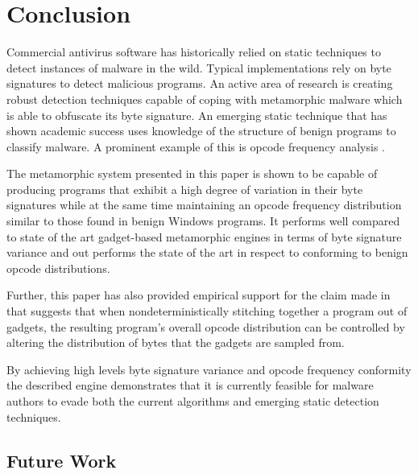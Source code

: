 \chapter{Conclusion}

    Commercial antivirus software has historically relied on static techniques
    to detect instances of malware in the wild. Typical implementations rely on
    byte signatures to detect malicious programs. An active area of research is
    creating robust detection techniques capable of coping with metamorphic
    malware which is able to obfuscate its byte signature. An emerging static
    technique that has shown academic success uses knowledge of the structure of
    benign programs to classify malware. A prominent example of this is opcode
    frequency analysis \cite{chisquared}.

    The metamorphic system presented in this paper is shown to be capable of
    producing programs that exhibit a high degree of variation in their
    byte signatures while at the same time maintaining an opcode frequency
    distribution similar to those found in benign Windows programs. It performs
    well compared to state of the art gadget-based metamorphic engines in terms
    of byte signature variance and out performs the state of the art in respect
    to conforming to benign opcode distributions.

    Further, this paper has also provided empirical support for the claim made
    in \cite{franken} that suggests that when nondeterministically stitching
    together a program out of gadgets, the resulting program's overall opcode
    distribution can be controlled by altering the distribution of bytes that
    the gadgets are sampled from.

    By achieving high levels byte signature variance and opcode frequency
    conformity the described engine demonstrates that it is currently feasible
    for malware authors to evade both the current algorithms and emerging static
    detection techniques. 

    \section{Future Work}

